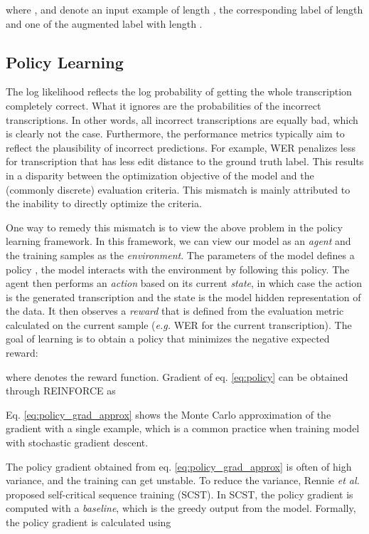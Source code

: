 \documentclass{article}
\newcommand{\eg}{\emph{e.g.}\xspace}
\newcommand{\etal}{\emph{et al.}\xspace}
\begin{document}
where ,  and  denote an input example of length , the corresponding label of length  and one of the augmented label with length .



\subsection{Policy Learning}
The log likelihood reflects the log probability of getting the whole transcription completely correct. What it ignores are the probabilities of the incorrect transcriptions. In other words, all incorrect transcriptions are equally bad, which is clearly not the case. Furthermore, the performance metrics typically aim to reflect the plausibility of incorrect predictions. For example, WER penalizes less for transcription that has less edit distance to the ground truth label.
This results in a disparity between the optimization objective of the model and the (commonly discrete) evaluation criteria. This mismatch is mainly attributed to the inability to directly optimize the criteria.

One way to remedy this mismatch is to view the above problem in the policy learning framework. In this framework, we can view our model as an \emph{agent} and the training samples as the \emph{environment}. The parameters of the model  defines a policy , the model interacts with the environment by following this policy. The agent then performs an \emph{action} based on its current \emph{state}, in which case the action is the generated transcription and the state is the model hidden representation of the data. It then observes a \emph{reward} that is defined from the evaluation metric
calculated on the current sample (\eg WER for the current transcription). The goal of learning is to obtain a policy that minimizes the negative expected reward:

where  denotes the reward function. Gradient of eq. \ref{eq:policy} can be obtained through REINFORCE \cite{williams1992simple} as

Eq. \ref{eq:policy_grad_approx} shows the Monte Carlo approximation of the gradient with a single example, which is a common practice when training model with stochastic gradient descent.


The policy gradient obtained from eq. \ref{eq:policy_grad_approx} is often of high variance, and the training can get unstable. To reduce the variance, Rennie \etal \cite{rennie2016self} proposed self-critical sequence training (SCST). In SCST, the policy gradient is computed with a \emph{baseline}, which is the greedy output from the model. Formally, the policy gradient is calculated using
\end{document}
